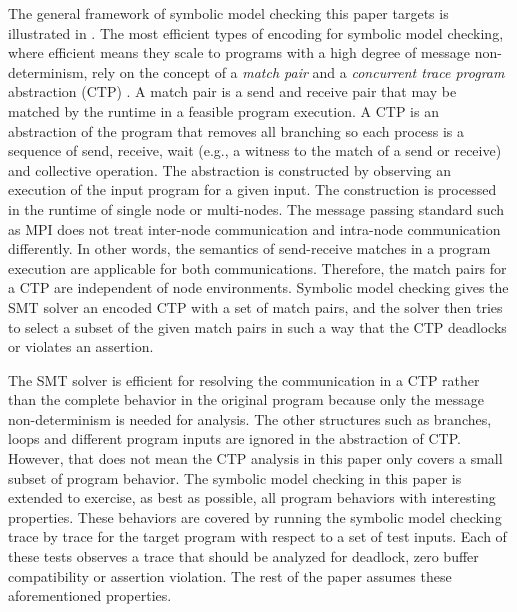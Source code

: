 The general framework of symbolic model checking this paper targets is illustrated in .
The most efficient types of encoding for symbolic model checking, where efficient means they scale to programs with a high degree of message non-determinism, rely on the concept of a \textit{match pair} and a \textit{concurrent trace program} abstraction (CTP) \cite{DBLP:conf/fmcad/SharmaGMH09,DBLP:conf/sigsoft/WangCGY09}.
A match pair is a send and receive pair that may be matched by the runtime in a feasible program execution. %
A CTP is an abstraction of the program that removes all branching so each process is a sequence of send, receive, wait (e.g., a witness to the match of a send or receive) and collective operation. %
The abstraction is constructed by observing an execution of the input program for a given input. 
The construction is processed in the runtime of single node or multi-nodes. The message passing standard such as MPI \cite{mpi3.1} does not treat inter-node communication and intra-node communication differently. In other words, the semantics of send-receive matches in a program execution are applicable for both communications. 
Therefore, the match pairs for a CTP are independent of node environments. 
Symbolic model checking gives the SMT solver an encoded CTP with a set of match pairs, and the solver then tries to select a subset of the given match pairs in such a way that the CTP deadlocks or violates an assertion. 

The SMT solver is efficient for resolving the communication in a CTP rather than the complete behavior in the original program because only the message non-determinism is needed for analysis. The other structures such as branches, loops and different program inputs are ignored in the abstraction of CTP.
However, that does not mean the CTP analysis in this paper only covers a small subset of program behavior.
The symbolic model checking in this paper is extended to exercise, as best as possible, all program behaviors with interesting properties. These behaviors are covered by running the symbolic model checking trace by trace for the target program with respect to a set of test inputs. Each of these tests observes a trace that should be analyzed for deadlock, zero buffer compatibility or assertion violation. The rest of the paper assumes these aforementioned properties.

